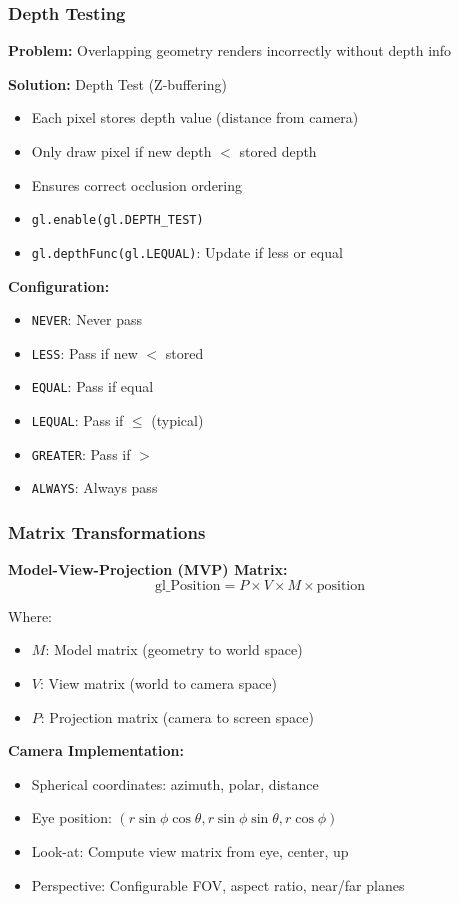 \begin{frame}
\frametitle{Depth Testing}

\textbf{Problem:} Overlapping geometry renders incorrectly without depth info

\vspace{0.5cm}

\textbf{Solution:} Depth Test (Z-buffering)
\begin{itemize}
  \item Each pixel stores depth value (distance from camera)
  \item Only draw pixel if new depth $<$ stored depth
  \item Ensures correct occlusion ordering
  \item \texttt{gl.enable(gl.DEPTH\_TEST)}
  \item \texttt{gl.depthFunc(gl.LEQUAL)}: Update if less or equal
\end{itemize}

\vspace{0.5cm}

\textbf{Configuration:}
\begin{itemize}
  \item \texttt{NEVER}: Never pass
  \item \texttt{LESS}: Pass if new $<$ stored
  \item \texttt{EQUAL}: Pass if equal
  \item \texttt{LEQUAL}: Pass if $\leq$ (typical)
  \item \texttt{GREATER}: Pass if $>$
  \item \texttt{ALWAYS}: Always pass
\end{itemize}
\end{frame}

\begin{frame}[fragile]
\frametitle{Matrix Transformations}

\textbf{Model-View-Projection (MVP) Matrix:}
$$\text{gl\_Position} = P \times V \times M \times \text{position}$$

Where:
\begin{itemize}
  \item $M$: Model matrix (geometry to world space)
  \item $V$: View matrix (world to camera space)
  \item $P$: Projection matrix (camera to screen space)
\end{itemize}

\vspace{0.5cm}

\textbf{Camera Implementation:}
\begin{itemize}
  \item Spherical coordinates: azimuth, polar, distance
  \item Eye position: $(r \sin\phi \cos\theta, r \sin\phi \sin\theta, r \cos\phi)$
  \item Look-at: Compute view matrix from eye, center, up
  \item Perspective: Configurable FOV, aspect ratio, near/far planes
\end{itemize}
\end{frame}